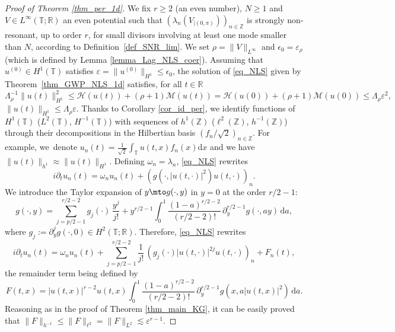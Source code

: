 \begin{proof}[Proof of Theorem \ref{thm_per_1d}] We fix $r\geq 2$ (an even number), $N\geq 1$ and $V\in L^\infty(\mathbb{T};\mathbb{R})$ an even potential such that $(\lambda_n(V_{|(0,\pi)}))_{n\in \mathbb{Z}}$ is strongly non-resonant, up to order $r$, for small divisors involving at least one mode smaller than $N$, according to Definition~\ref{def_SNR_lim}. We set $\rho = \|V\|_{L^\infty}$ and $\epsilon_0 = \varepsilon_{\rho}$ (which is defined by Lemma \ref{lemma_Lag_NLS_coer}). Assuming that $u^{(0)}\in H^1(\mathbb{T})$ satisfies $\varepsilon = \| u^{(0)} \|_{H^1} \leq \epsilon_0$, the solution of \eqref{eq_NLS} given by Theorem~\ref{thm_GWP_NLS_1d} satisfies, for all $t\in \mathbb{R}$
\begin{equation}
\label{eq_glob_cont_norm}
\Lambda_\rho^{-1} \| u(t) \|_{H^1}^2 \leq \mathcal{H}(u(t))+ (\rho+1) \mathcal{M}(u(t)) = \mathcal{H}(u(0))+ (\rho+1) \mathcal{M}(u(0)) \leq \Lambda_\rho \varepsilon^2,
\end{equation}
\ie $\| u(t) \|_{H^1}\leq \Lambda_{\rho} \varepsilon$. Thanks to Corollary \ref{cor_id_per}, we identify functions of $H^1(\mathbb{T})$ (\resp $L^2(\mathbb{T})$, \resp $H^{-1}(\mathbb{T})$) with sequences of $h^1(\mathbb{Z})$ (\resp $\ell^2(\mathbb{Z})$, \resp $h^{-1}(\mathbb{Z})$) through their decompositions in the Hilbertian basis $(f_n/\sqrt{2})_{n\in \mathbb{Z}}$. For example, we~denote $u_n(t) = \frac1{\sqrt2} \int_\mathbb{T} u(t,x) f_n(x) \mathrm{d}x$ and we have $\| u(t) \|_{h^1} \approx \| u(t) \|_{H^1}$. Defining $\omega_n = \lambda_n$, \eqref{eq_NLS} rewrites
\[
i\partial_t u_n(t) = \omega_n u_n(t) + (g(\cdot,|u(t,\cdot)|^2) u(t,\cdot))_{n}.
\]
We introduce the Taylor expansion of $y\mto g(\cdot,y)$ in $y=0$ at the order $r/2-1$:
\[
g(\cdot,y) = \sum_{j=p/2-1}^{r/2-2} g_j(\cdot)\, \frac{y^j}{j !} + y^{r/2-1}\int_0^1 \frac{(1-a)^{r/2-2}}{(r/2-2) ! }\, \partial_y^{r/2-1} g(\cdot, a y) \, \mathrm{d}a,
\]
where $g_j:= \partial_y^j g(\cdot,0) \in H^2(\mathbb{T};\mathbb{R})$. Therefore, \eqref{eq_NLS} rewrites
\[
i\partial_t u_n(t) = \omega_n u_n(t) + \sum_{j=p/2-1}^{r/2-2} \frac1{j!}\, (g_j(\cdot) |u(t,\cdot)|^{2j}u(t,\cdot))_n + F_n(t),
\]
the remainder term being defined by
\[
F(t,x)=|u(t,x)|^{r-2}u(t,x) \int_0^1 \frac{(1-a)^{r/2-2}}{(r/2-2) ! }\, \partial_y^{r/2-1} g(x, a |u(t,x)|^{2}) \, \mathrm{d}a.
\]
Reasoning as in the proof of Theorem \ref{thm_main_KG}, it can be easily proved that $\| F\|_{h^{-1}} \leq \| F\|_{\ell^2} = \| F\|_{L^2} \lesssim \varepsilon^{r-1}$.


\end{proof}
